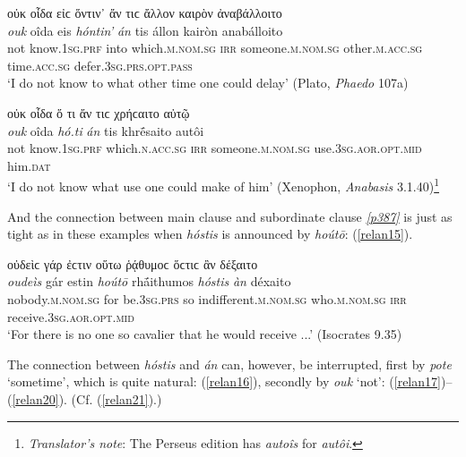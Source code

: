 \begin{exe}
\ex οὐκ οἶδα εἰϲ ὅντιν᾽ ἄν τιϲ ἄλλον καιρὸν ἀναβάλλοιτο\\
\gll \emph{ouk} oîda eis \emph{hóntin'} \emph{án} tis állon kairòn anabálloito\\
not know.\textsc{1sg.prf} into which.\textsc{m.nom.sg} \textsc{irr} someone.\textsc{m.nom.sg} other.\textsc{m.acc.sg} time.\textsc{acc.sg} defer.\textsc{3sg.prs.opt.pass}\\
\trans `I do not know to what other time one could delay' (Plato, \textit{Phaedo} 107a)
\label{relan13}
\end{exe}

\begin{exe}
\ex οὐκ οἶδα ὅ τι ἄν τιϲ χρήϲαιτο αὐτῷ\\
\gll \emph{ouk} oîda \emph{hó.ti} \emph{án} tis khrḗsaito autôi\\
not know.\textsc{1sg.prf} which.\textsc{n.acc.sg} \textsc{irr}
someone.\textsc{m.nom.sg} use.\textsc{3sg.aor.opt.mid} him.\textsc{dat}\\
\trans `I do not know what use one could make of him' (Xenophon, \textit{Anabasis} 3.1.40)\footnote{\emph{Translator's note}: The Perseus edition has \textit{autoîs} for \textit{autôi}.}
\label{relan14}
\end{exe}

And the connection between main clause and subordinate clause \hyperlink{p387}{\emph{[p387]}} is just as tight as in these examples when \emph{hóstis} is announced by \emph{hoútō}: (\ref{relan15}).

\begin{exe}
\ex οὐδεὶϲ γάρ ἐϲτιν οὕτω ῥᾴθυμοϲ ὅϲτιϲ ἂν δέξαιτο\\
\gll \emph{oudeìs} gár estin \emph{hoútō} rhā́ithumos \emph{hóstis} \emph{àn} déxaito\\
nobody.\textsc{m.nom.sg} for be.\textsc{3sg.prs} so indifferent.\textsc{m.nom.sg} who.\textsc{m.nom.sg} \textsc{irr} receive.\textsc{3sg.aor.opt.mid}\\
\trans `For there is no one so cavalier that he would receive ...' (Isocrates 9.35)
\label{relan15}
\end{exe}

The connection between \emph{hóstis} and \emph{án} can, however, be interrupted, first by \emph{pote} `sometime', which is quite natural: (\ref{relan16}), secondly by \emph{ouk} `not': (\ref{relan17})--(\ref{relan20}). (Cf. (\ref{relan21}).)

